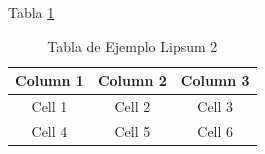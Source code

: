     
    \begin{justify}
        \lipsum[6] Tabla \ref{tab:example_table2} \\
    \end{justify}

    \begin{table}[htbp]
        \centering
            \begin{tabular}{|c|c|c|}
            \hline
            \textbf{Column 1} & \textbf{Column 2} & \textbf{Column 3} \\
            \hline
            Cell 1 & Cell 2 & Cell 3 \\
            \hline
            Cell 4 & Cell 5 & Cell 6 \\
            \hline
        \end{tabular}
        \caption{Tabla de Ejemplo Lipsum 2}
        \label{tab:example_table2}
    \end{table}
